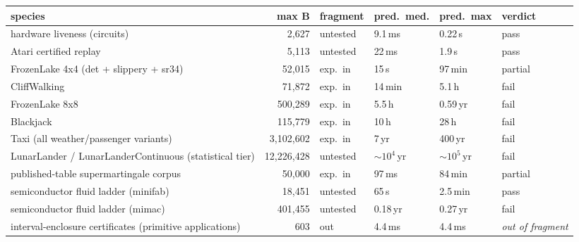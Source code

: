 {\setlength{\tabcolsep}{4pt}%
\begin{tabular}{@{}p{10.5em}rllll@{}}
\toprule
species & max B & fragment & pred.\ med. & pred.\ max & verdict \\
\midrule
hardware liveness (circuits) & 2{,}627 & untested & 9.1\,ms & 0.22\,s & pass \\
Atari certified replay & 5{,}113 & untested & 22\,ms & 1.9\,s & pass \\
FrozenLake 4x4 (det + slippery + sr34) & 52{,}015 & exp.\ in & 15\,s & 97\,min & partial \\
CliffWalking & 71{,}872 & exp.\ in & 14\,min & 5.1\,h & fail \\
FrozenLake 8x8 & 500{,}289 & exp.\ in & 5.5\,h & 0.59\,yr & fail \\
Blackjack & 115{,}779 & exp.\ in & 10\,h & 28\,h & fail \\
Taxi (all weather/passenger variants) & 3{,}102{,}602 & exp.\ in & 7\,yr & 400\,yr & fail \\
LunarLander / LunarLanderContinuous (statistical tier) & 12{,}226{,}428 & untested & $\sim$$10^{4}$\,yr & $\sim$$10^{5}$\,yr & fail \\
published-table supermartingale corpus & 50{,}000 & exp.\ in & 97\,ms & 84\,min & partial \\
semiconductor fluid ladder (minifab) & 18{,}451 & untested & 65\,s & 2.5\,min & pass \\
semiconductor fluid ladder (mimac) & 401{,}455 & untested & 0.18\,yr & 0.27\,yr & fail \\
interval-enclosure certificates (primitive applications) & 603 & out & 4.4\,ms & 4.4\,ms & \emph{out of fragment} \\
\bottomrule
\end{tabular}}
